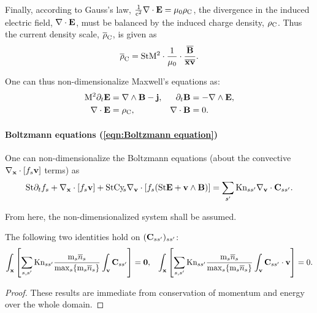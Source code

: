     Finally, according to Gauss's law, $\frac{1}{\mathrm{c}^{2}}\nabla\cdot\mathbf{E}  =  \mu_{0}\rho_{\mathrm{C}}$, the divergence in the induced electric field, $\nabla\cdot\mathbf{E}$, must be balanced by the induced charge density, $\rho_{\mathrm{C}}$. Thus the current density scale, $\overline{\rho}_{\mathrm{C}}$, is given as
    \begin{equation}
        \overline{\rho}_{\mathrm{C}}  =  \mathrm{St}\mathrm{M}^{2}\cdot\frac{1}{\mu_{0}}\cdot\frac{\overline{\mathbf{B}}}{\overline{\mathbf{x}}\overline{\mathbf{v}}}.
    \end{equation}
    
    One can thus non-dimensionalize Maxwell's equations as:
    \begin{align}
        \mathrm{M}^{2}\partial_{t}\mathbf{E}  &=  \nabla\wedge\mathbf{B} - \mathbf{j},  &
        \partial_{t}\mathbf{B}  &=  - \nabla\wedge\mathbf{E},  \label{eqn:Maxwell's equations transient non-dimensionalized}  \\
        \nabla\cdot\mathbf{E}  &=  \rho_{\mathrm{C}},  &
        \nabla\cdot\mathbf{B}  &=  0.  \label{eqn:Maxwell's equations steady-state non-dimensionalized}
    \end{align}

    \paragraph*{Boltzmann equations (\ref{eqn:Boltzmann equation})} One can non-dimensionalize the Boltzmann equations (about the convective $\nabla_{\mathbf{x}}\cdot[f_{s}\mathbf{v}]$ terms) as
    \begin{equation}\label{eqn:Boltzmann equation non-dimensionalized}
        \mathrm{St}\partial_{t}f_{s} + \nabla_{\mathbf{x}}\cdot[f_{s}\mathbf{v}] + \mathrm{St}\mathrm{Cy}\!_{s}\nabla_{\mathbf{v}}\cdot[f_{s}(\mathrm{St}\mathbf{E} + \mathbf{v}\wedge\mathbf{B})]  =  \sum_{s'}\mathrm{Kn}_{ss'}\nabla_{\mathbf{v}}\cdot\mathbf{C}_{ss'}.
    \end{equation}
    
    \shortline

    From here, the non-dimensionalized system shall be assumed.
    
    \begin{lemma}\label{lem:conservation on collision operators}
        The following two identities hold on $(\mathbf{C}_{ss'})_{ss'}$:
        \begin{align}
            \int_{\mathbf{x}}\left[\sum_{s, s'}\mathrm{Kn}_{ss'}\frac{\mathrm{m}_{s}\overline{n}_{s}}{\max_{s}\{\mathrm{m}_{s}\overline{n}_{s}\}}\int_{\mathbf{v}}\mathbf{C}_{ss'}\right]  =  \mathbf{0},  &&
            \int_{\mathbf{x}}\left[\sum_{s, s'}\mathrm{Kn}_{ss'}\frac{\mathrm{m}_{s}\overline{n}_{s}}{\max_{s}\{\mathrm{m}_{s}\overline{n}_{s}\}}\int_{\mathbf{v}}\mathbf{C}_{ss'}\cdot\mathbf{v}\right]  =  0.
        \end{align}
    \end{lemma}
    \begin{proof}
        These results are immediate from conservation of momentum and energy over the whole domain.
    \end{proof}
    